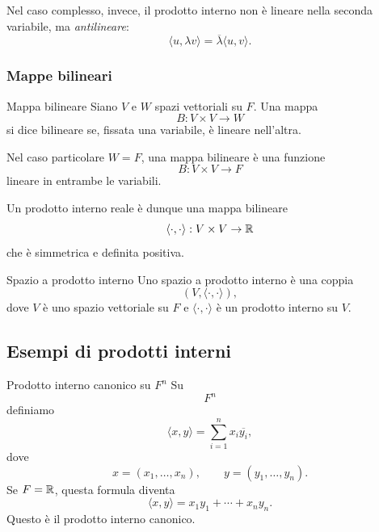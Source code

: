 \documentclass[a4paper]{article}
\begin{document}
Nel caso complesso, invece, il prodotto interno non è lineare nella seconda variabile, ma \emph{antilineare}:
\[
    \langle u,\lambda v\rangle=\overline{\lambda}\langle u,v\rangle.
\]

\subsubsection{Mappe bilineari}

\begin{snippetdefinition}{Mappa bilineare}
    Siano \(V\) e \(W\) spazi vettoriali su \(F\). Una mappa
    \[
        B:V\times V\to W
    \]
    si dice bilineare se, fissata una variabile, è lineare nell'altra.

    Nel caso particolare \(W=F\), una mappa bilineare è una funzione
    \[
        B:V\times V\to F
    \]
    lineare in entrambe le variabili.
\end{snippetdefinition}

Un prodotto interno reale è dunque una mappa bilineare
\[
    \langle\cdot,\cdot\rangle:V\times V\to\mathbb{R}
\]
che è simmetrica e definita positiva.

\begin{snippetdefinition}{Spazio a prodotto interno}
    Uno spazio a prodotto interno è una coppia
    \[
        (V,\langle\cdot,\cdot\rangle),
    \]
    dove \(V\) è uno spazio vettoriale su \(F\) e \(\langle\cdot,\cdot\rangle\) è un prodotto interno su \(V\).
\end{snippetdefinition}

\subsection{Esempi di prodotti interni}

\begin{snippetexample}{Prodotto interno canonico su \(F^n\)}
    Su
    \[
        F^n
    \]
    definiamo
    \[
        \langle x,y\rangle
        =
        \sum_{i=1}^{n}x_i\overline{y_i},
    \]
    dove
    \[
        x=(x_1,\ldots,x_n),
        \qquad
        y=(y_1,\ldots,y_n).
    \]
    Se \(F=\mathbb{R}\), questa formula diventa
    \[
        \langle x,y\rangle=x_1y_1+\cdots+x_ny_n.
    \]
    Questo è il prodotto interno canonico.
\end{snippetexample}
\end{document}
